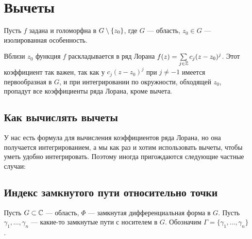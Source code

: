 \documentclass[a4paper]{report}
\begin{document}
    \section{Вычеты}
    Пусть $f$ задана и голоморфна в $G \setminus \{z_0\}$, где $G$ --- область, $z_0 \in G$ --- изолированная особенность.

    Вблизи $z_0$ функция $f$ раскладывается в ряд Лорана $f(z) = \sum\limits_{j \in \mathbb{Z}}c_j (z - z_0)^j$.
    Этот коэффициент так важен, так как у $c_j (z - z_0)^j$ при $j \ne -1$ имеется первообразная в $G$, и при интегрировании по окружности, обходящей $z_0$, пропадут все коэффициенты ряда Лорана, кроме вычета.
    \subsection{Как вычислять вычеты}
    У нас есть формула для вычисления коэффициентов ряда Лорана, но она получается интегрированием, а мы как раз и хотим использовать вычеты, чтобы уметь удобно интегрировать.
    Поэтому иногда пригождаются следующие частные случаи:
    \subsection{Индекс замкнутого пути относительно точки}
    Пусть $G \subset \mathbb{C}$ --- область, $\Phi$ --- замкнутая дифференциальная форма в $G$.
    Пусть $\gamma_1, \dots, \gamma_n$ --- какие-то замкнутые пути с носителем в $G$.
    Обозначим $\Gamma = \{\gamma_1, \dots, \gamma_n\}$.
\end{document}
